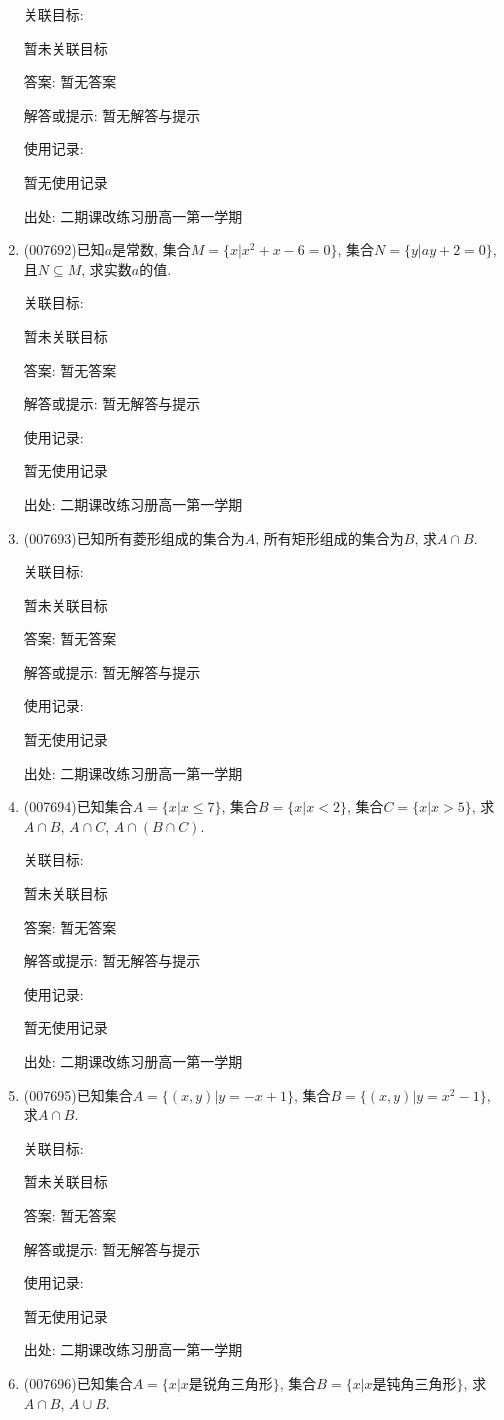 \documentclass[10pt,a4paper]{article}
\begin{document}
\begin{enumerate}[1.]
关联目标:

暂未关联目标

答案: 暂无答案

解答或提示: 暂无解答与提示

使用记录:

暂无使用记录


出处: 二期课改练习册高一第一学期
\item { (007692)}已知$a$是常数, 集合$M=\{x|x^2+x-6=0\}$, 集合$N=\{y|ay+2=0\}$, 且$N\subseteq M$, 求实数$a$的值.


关联目标:

暂未关联目标

答案: 暂无答案

解答或提示: 暂无解答与提示

使用记录:

暂无使用记录


出处: 二期课改练习册高一第一学期
\item { (007693)}已知所有菱形组成的集合为$A$, 所有矩形组成的集合为$B$, 求$A\cap B$.


关联目标:

暂未关联目标

答案: 暂无答案

解答或提示: 暂无解答与提示

使用记录:

暂无使用记录


出处: 二期课改练习册高一第一学期
\item { (007694)}已知集合$A=\{x|x\le 7\}$, 集合$B=\{x|x<2\}$, 集合$C=\{x|x>5\}$, 求$A\cap B$, $A\cap C$, $A\cap (B\cap C)$.


关联目标:

暂未关联目标

答案: 暂无答案

解答或提示: 暂无解答与提示

使用记录:

暂无使用记录


出处: 二期课改练习册高一第一学期
\item { (007695)}已知集合$A=\{(x,y)|y=-x+1\}$, 集合$B=\{(x,y)|y=x^2-1\}$, 求$A\cap B$.


关联目标:

暂未关联目标

答案: 暂无答案

解答或提示: 暂无解答与提示

使用记录:

暂无使用记录


出处: 二期课改练习册高一第一学期
\item { (007696)}已知集合$A=\{x|x\text{是锐角三角形}\}$, 集合$B=\{x|x\text{是钝角三角形}\}$, 求$A\cap B$, $A\cup B$.



\end{enumerate}
\end{document}
